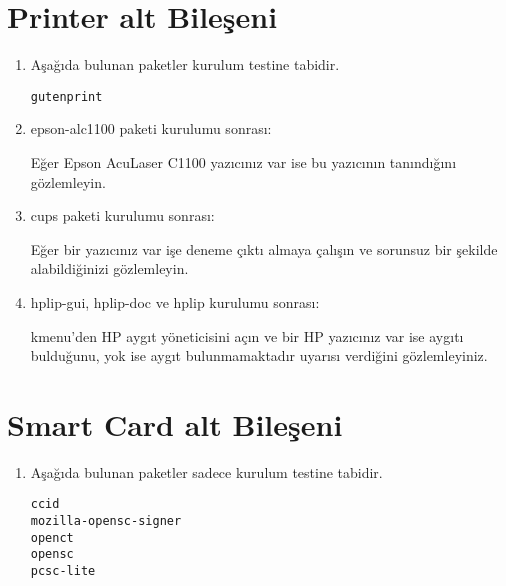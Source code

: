 \documentclass[a4paper,10pt]{article}
\begin{document}
\section{Printer alt Bileşeni}
\begin{enumerate}

\item Aşağıda bulunan paketler kurulum testine tabidir.
\begin{verbatim}
gutenprint 
\end{verbatim}
\item epson-alc1100 paketi kurulumu sonrası:

Eğer Epson AcuLaser C1100 yazıcınız var ise bu yazıcının tanındığını gözlemleyin.

\item cups paketi kurulumu sonrası:

Eğer bir yazıcınız var işe deneme çıktı almaya çalışın ve sorunsuz bir şekilde alabildiğinizi gözlemleyin.

\item hplip-gui, hplip-doc ve hplip kurulumu sonrası:

kmenu'den HP aygıt yöneticisini açın ve bir HP yazıcınız var ise aygıtı bulduğunu, yok ise aygıt bulunmamaktadır uyarısı verdiğini gözlemleyiniz.
    
\end{enumerate}

\section{Smart Card alt Bileşeni}
\begin{enumerate}
 \item Aşağıda bulunan paketler sadece kurulum testine tabidir.
\begin{verbatim}
ccid 
mozilla-opensc-signer
openct
opensc
pcsc-lite
\end{verbatim}


\end{enumerate}
\end{document}
